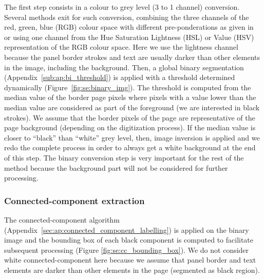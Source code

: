 The first step consists in a colour to grey level (3 to 1 channel) conversion.
Several methods exit for such conversion, combining the three channels of the red, green, blue (RGB) colour space with different pre-ponderations as given in~\cite{Pratt91} or using one channel from the Hue Saturation Lightness (HSL) or Value (HSV) representation of the RGB colour space.
Here we use the lightness channel because the panel border strokes and text are usually darker than other elements in the image, including the background. 
Then, a global binary segmentation (Appendix~\ref{sub:ap:bi_threshold}) is applied with a threshold determined dynamically (Figure~\ref{fig:se:binary_img}).
The threshold is computed from the median value of the border page pixels where pixels with a value lower than the median value are considered as part of the foreground (we are interested in black strokes).
We assume that the border pixels of the page are representative of the page background (depending on the digitization process).
If the median value is closer to ``black'' than ``white'' grey level, then, image inversion is applied and we redo the complete process in order to always get a white background at the end of this step.
The binary conversion step is very important for the rest of the method because the background part will not be considered for further processing. %


\subsubsection{Connected-component extraction} %
 \label{par:connected_component_extraction}
 
The connected-component algorithm (Appendix~\ref{sec:ap:connected_component_labelling}) is applied on the binary image and the bounding box of each black component is computed to facilitate subsequent processing (Figure \ref{fig:se:cc_bounding_box}).
We do not consider white connected-component here because we assume that panel border and text elements are darker than other elements in the page (segmented as black region).

